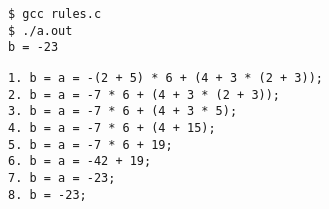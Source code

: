 \begin{frame}[fragile]\ft{\subsecname}
\begin{lstlisting}[backgroundcolor=\color{red!10}]
$ gcc rules.c
$ ./a.out  
b = -23
\end{lstlisting}
\end{frame}

\begin{frame}[fragile]\ft{\subsecname}
\begin{lstlisting}[backgroundcolor=\color{red!10}]
1. b = a = -(2 + 5) * 6 + (4 + 3 * (2 + 3));
2. b = a = -7 * 6 + (4 + 3 * (2 + 3));
3. b = a = -7 * 6 + (4 + 3 * 5);
4. b = a = -7 * 6 + (4 + 15);
5. b = a = -7 * 6 + 19;
6. b = a = -42 + 19;
7. b = a = -23;
8. b = -23;
\end{lstlisting}
\end{frame}

